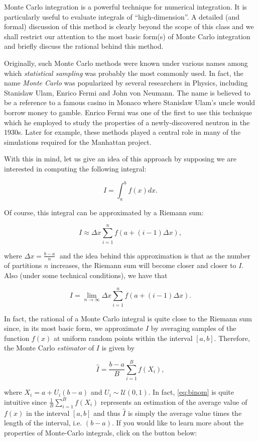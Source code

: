 \documentclass[12pt,]{krantz}
\begin{document}
Monte Carlo integration is a powerful technique for numerical
integration. It is particularly useful to evaluate integrals of
``high-dimension''. A detailed (and formal) discussion of this method is
clearly beyond the scope of this class and we shall restrict our
attention to the most basic form(s) of Monte Carlo integration and
briefly discuss the rational behind this method.

Originally, such Monte Carlo methods were known under various names
among which \emph{statistical sampling} was probably the most commonly
used. In fact, the name \emph{Monte Carlo} was popularized by several
researchers in Physics, including Stanislaw Ulam, Enrico Fermi and John
von Neumann. The name is believed to be a reference to a famous casino
in Monaco where Stanislaw Ulam's uncle would borrow money to gamble.
Enrico Fermi was one of the first to use this technique which he
employed to study the properties of a newly-discovered neutron in the
1930s. Later for example, these methods played a central role in many of
the simulations required for the Manhattan project.

With this in mind, let us give an idea of this approach by supposing we
are interested in computing the following integral:

\[I = \int_a^b f(x) dx.\]

Of course, this integral can be approximated by a Riemann sum:

\[I \approx \Delta x \sum_{i = 1}^n f(a + (i-1) \Delta x),\]

where \(\Delta x = \frac{b - a}{n}\;\) and the idea behind this
approximation is that as the number of partitions \(n\) increases, the
Riemann sum will become closer and closer to \(I\). Also (under some
technical conditions), we have that

\[I = \lim_{n \to \infty} \Delta x \sum_{i = 1}^n f(a + (i-1) \Delta x).\]

In fact, the rational of a Monte Carlo integral is quite close to the
Riemann sum since, in its most basic form, we approximate \(I\) by
averaging samples of the function \(f(x)\) at uniform random points
within the interval \([a, b]\). Therefore, the Monte Carlo
\emph{estimator} of \(I\) is given by

\begin{equation} 
\hat{I} = \frac{b - a}{B} \sum_{i = 1}^B f(X_i), 
 \label{eq:binom}
\end{equation}

where \(X_i = a + U_i (b - a)\) and \(U_i \sim \mathcal{U}(0,1)\). In
fact, \eqref{eq:binom} is quite intuitive since
\(\frac{1}{B} \sum_{i = 1}^B f(X_i)\) represents an estimation of the
average value of \(f(x)\) in the interval \([a, b]\) and thus
\(\hat{I}\) is simply the average value times the length of the
interval, i.e. \((b-a)\). If you would like to learn more about the
properties of Monte-Carlo integrals, click on the button below:
\end{document}
